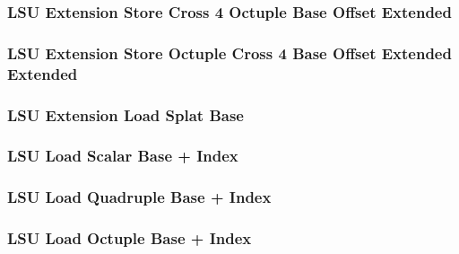 \subsubsection[{\small LSU Extension Store Cross 4 Octuple Base Offset Extended}]{LSU Extension Store Cross 4 Octuple Base Offset Extended} \label{sec:format-LSU-XSOC4BO.X}



\subsubsection[{\small LSU Extension Store Octuple Cross 4 Base Offset Extended Extended}]{LSU Extension Store Octuple Cross 4 Base Offset Extended Extended} \label{sec:format-LSU-XSOC4BO.Y}



\subsubsection[{\small LSU Extension Load Splat Base}]{LSU Extension Load Splat Base} \label{sec:format-LSU-XLSB}



\subsubsection[{\small LSU Load Scalar Base + Index}]{LSU Load Scalar Base + Index} \label{sec:format-LSU-LSBI}



\subsubsection[{\small LSU Load Quadruple Base + Index}]{LSU Load Quadruple Base + Index} \label{sec:format-LSU-LQBI}



\subsubsection[{\small LSU Load Octuple Base + Index}]{LSU Load Octuple Base + Index} \label{sec:format-LSU-LOBI}

